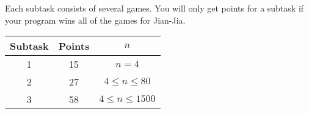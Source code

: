 Each subtask consists of several games. You will only get points for a subtask if your program wins all of the games for Jian-Jia.

\begin{center}
\renewcommand{\arraystretch}{1.5}
\begin{tabular}{|c|c|c|}
\hline
Subtask & Points & $n$ \\
\hline
1 &  15 & $n = 4$ \\
\hline
2 & 27 & $4 \le n \le 80$ \\
\hline
3 & 58 & $4 \le n \le 1500$ \\
\hline
\end{tabular}
\end{center}

